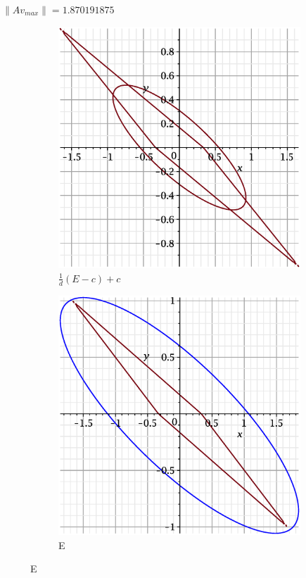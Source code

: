 \documentclass{beamer}
\begin{document}
\begin{frame}
\end{frame}

\begin{frame}
$\|Av_{max}\| = 1.870191875$  
    \begin{figure}
    \begin{subfigure}{.5\textwidth}
        \centering
        \includegraphics[width=.8\linewidth]{pictures/2.eps}
        \caption{$\displaystyle\frac{1}{d}(E-c)+c$}
    \label{fig:sfig1}
    \end{subfigure}%
    \begin{subfigure}{.5\textwidth}
        \centering
        \includegraphics[width=.8\linewidth]{pictures/1_2.eps}
        \caption{E}
    \label{fig:sfig2}
    \end{subfigure}
\end{figure}

\end{frame}
\end{document}
